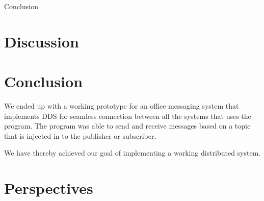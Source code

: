 {Conclusion}
\section{Discussion}


\section{Conclusion}
We ended up with a working prototype for an office messaging system that implements DDS for seamless connection between all the systems that uses the program.
The program was able to send and receive messages based on a topic that is injected in to the publisher or subscriber.

We have thereby achieved our goal of implementing a working distributed system.

\section{Perspectives}


